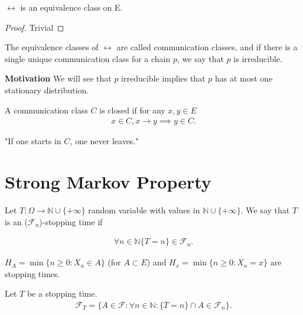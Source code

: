 \begin{prop}[]
	$\leftrightarrow$ is an equivalence class on E.
\end{prop}
\begin{proof}
Trivial\end{proof}


\begin{defn}
	The equivalence classes of $ \leftrightarrow $ are called communication classes, and if there is a single unique communication class for a chain $p$, we say that $p$ is irreducible.
\end{defn}

\noindent
\textbf{Motivation} We will see that $p$ irreducible implies that $p$ has at most one stationary distribution.

\begin{defn}
	A communication class $C$ is closed if for any $x,y \in E$
\begin{align}
 x \in C, x \to y \implies y \in C.
\end{align}
\end{defn}
"If one starts in $C$, one never leaves."

\section{Strong Markov Property}
	
\begin{defn}
	Let $T:\Omega \to \mathbb{N} \cup \{+\infty\}$ random variable with values in $\mathbb{N}\cup\{+\infty\}$. We say that $T$ is an ($ \mathcal{F}_n$)-stopping time if
	
	\begin{align}
		\forall n \in \mathbb{N} \{T=n\} \in \mathcal{F}_n
	.\end{align}
\end{defn}

\begin{ex}
	$H_{A}=\min\{n \geq 0: X_n \in  A\}$ (for $A \subset E$) and $H_x=\min\{n\geq 0: X_n = x\}$ are stopping times.
\end{ex}

\begin{defn}
	Let $T$ be a stopping time. 
	\begin{align}
	\mathcal{F}_T=\{A \in \mathcal{F}: \forall n \in \mathbb{N}: \{T=n\}\cap A \in \mathcal{F}_n \}.
	\end{align}
\end{defn}

